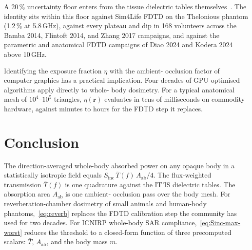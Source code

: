 \documentclass[journal,twocolumn,10pt]{IEEEtran}
\theoremstyle{plain}
\theoremstyle{remark}
\newcommand{\rr}{\mathbf{r}}
\newcommand{\Sinc}{S_{\mathrm{inc}}}
\newcommand{\Aab}{A_{\mathrm{ab}}}
\newcommand{\Tbar}{\bar{T}}
\begin{document}
A 20\,\% uncertainty floor enters from the tissue dielectric tables
themselves~\cite{AlekseevZiskin2007}. The identity sits within this
floor against Sim4Life FDTD on the Thelonious phantom (1.2\,\% at
5.8\,GHz), against every plateau and dip in 168 volunteers across the
Bamba 2014, Flintoft 2014, and Zhang 2017 campaigns, and against the
parametric and anatomical FDTD campaigns of Diao 2024 and Kodera 2024
above 10\,GHz.

Identifying the exposure fraction $\eta$ with the ambient-
occlusion factor of computer graphics has a practical implication.
Four decades of GPU-optimised algorithms apply directly to whole-
body dosimetry. For a typical anatomical mesh of $10^4$--$10^5$
triangles, $\eta(\rr)$ evaluates in tens of milliseconds on commodity
hardware, against minutes to hours for the FDTD step it replaces.

\section{Conclusion}\label{sec:concl}

The direction-averaged whole-body absorbed power on any opaque body in
a statistically isotropic field equals $\Sinc\,\Tbar(f)\,\Aab/4$. The
flux-weighted transmission $\Tbar(f)$ is one quadrature against the
IT'IS dielectric tables. The absorption area $\Aab$ is one ambient-
occlusion pass over the body mesh. For reverberation-chamber
dosimetry of small animals and human-body
phantoms,~\eqref{eq:reverb} replaces the FDTD calibration step the
community has used for two decades. For ICNIRP whole-body SAR
compliance,~\eqref{eq:Sinc-max-worst} reduces the threshold to a
closed-form function of three precomputed scalars: $\Tbar$, $\Aab$,
and the body mass $m$.




\end{document}

